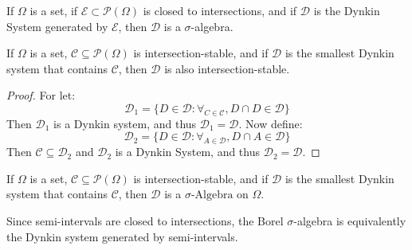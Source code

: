         \begin{theorem}
            If $\Omega$ is a set, if
            $\mathcal{E}\subset\mathcal{P}(\Omega)$ is closed
            to intersections, and if $\mathcal{D}$ is the
            Dynkin System generated by $\mathcal{E}$, then
            $\mathcal{D}$ is a $\sigma$-algebra.
        \end{theorem}
        \begin{theorem}
            If $\Omega$ is a set, $\mathcal{C}\subseteq\mathcal{P}(\Omega)$
            is intersection-stable, and if $\mathcal{D}$ is the smallest
            Dynkin system that contains $\mathcal{C}$, then $\mathcal{D}$
            is also intersection-stable.
        \end{theorem}
        \begin{proof}
            For let:
            \begin{equation}
                \mathcal{D}_{1}=
                \{D\in\mathcal{D}:\forall_{C\in\mathcal{C}},D\cap{D}\in\mathcal{D}\}
            \end{equation}
            Then $\mathcal{D}_{1}$ is a Dynkin system, and thus
            $\mathcal{D}_{1}=\mathcal{D}$. Now define:
            \begin{equation}
                \mathcal{D}_{2}=\{
                    D\in\mathcal{D}:\forall_{A\in\mathcal{D}},D\cap{A}\in\mathcal{D}
                \}
            \end{equation}
            Then $\mathcal{C}\subseteq\mathcal{D}_{2}$ and $\mathcal{D}_{2}$ is a
            Dynkin System, and thus $\mathcal{D}_{2}=\mathcal{D}$.
        \end{proof}
        \begin{theorem}
            If $\Omega$ is a set, $\mathcal{C}\subseteq\mathcal{P}(\Omega)$
            is intersection-stable, and if $\mathcal{D}$ is the smallest
            Dynkin system that contains $\mathcal{C}$, then $\mathcal{D}$
            is a $\sigma\textrm{-Algebra}$ on $\Omega$.
        \end{theorem}
        Since semi-intervals are closed to intersections,
        the Borel $\sigma$-algebra is equivalently the
        Dynkin system generated by semi-intervals.
